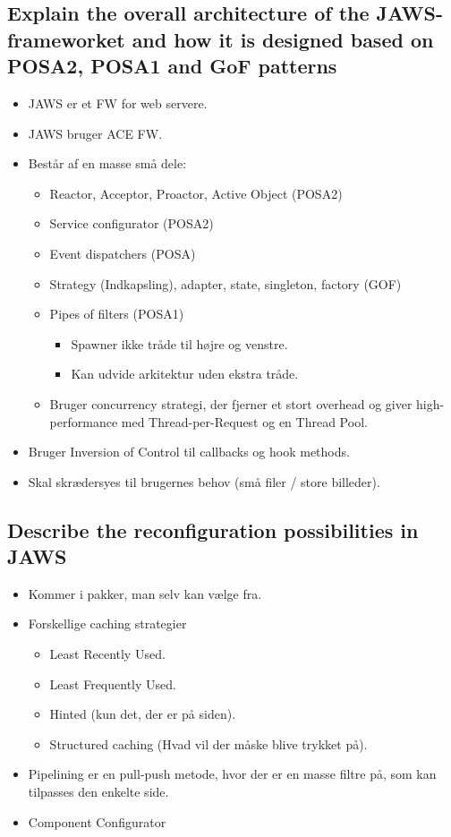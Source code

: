 \documentclass{article}
\begin{document}
\subsection{Explain the overall architecture of the JAWS-frameworket and how it is designed based on POSA2, POSA1 and GoF patterns}
\begin{itemize}
	\item JAWS er et FW for web servere.
	\item JAWS bruger ACE FW.
	\item Består af en masse små dele: 
	\begin{itemize}
		\item Reactor, Acceptor, Proactor, Active Object (POSA2)
		\item Service configurator (POSA2)
		\item Event dispatchers (POSA)
		\item Strategy (Indkapsling), adapter, state, singleton, factory (GOF)
		\item Pipes of filters (POSA1)
		\begin{itemize}
			\item Spawner ikke tråde til højre og venstre.
			\item Kan udvide arkitektur uden ekstra tråde.
		\end{itemize}
		\item Bruger concurrency strategi, der fjerner et stort overhead og giver high-performance med Thread-per-Request og en Thread Pool.
	\end{itemize}
	\item Bruger Inversion of Control til callbacks og hook methods.
	\item Skal skrædersyes til brugernes behov (små filer / store billeder).
\end{itemize}


\subsection{Describe the reconfiguration possibilities in JAWS}
\begin{itemize}
	\item Kommer i pakker, man selv kan vælge fra.
	\item Forskellige caching strategier
	\begin{itemize}
		\item Least Recently Used.
		\item Least Frequently Used.
		\item Hinted (kun det, der er på siden).
		\item Structured caching (Hvad vil der måske blive trykket på).
	\end{itemize}
	\item Pipelining er en pull-push metode, hvor der er en masse filtre på, som kan tilpasses den enkelte side.

	\item Component Configurator
\end{itemize}
\end{document}
